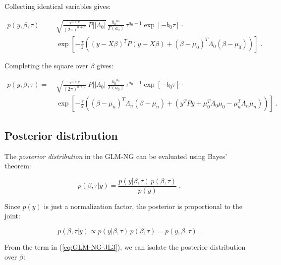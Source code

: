 Collecting identical variables gives:

\vspace{-0.5em}
\begin{equation} \label{eq:GLM-NG-JL2}
\begin{split}
p(y,\beta,\tau) = \; & \sqrt{\frac{\tau^{n+p}}{(2 \pi)^{n+p}} |P| |\Lambda_0|} \, \frac{{b_0}^{a_0}}{\Gamma(a_0)} \, \tau^{a_0-1} \exp[-b_0 \tau] \cdot \\
& \exp\left[ -\frac{\tau}{2} \left( (y-X\beta)^T P (y-X\beta) + (\beta-\mu_0)^T \Lambda_0 (\beta-\mu_0) \right) \right] \; .
\end{split}
\end{equation}

\pagebreak
Completing the square over $\beta$ gives:

\vspace{-0.5em}
\begin{equation} \label{eq:GLM-NG-JL3}
\begin{split}
p(y,\beta,\tau) = \; & \sqrt{\frac{\tau^{n+p}}{(2 \pi)^{n+p}} |P| |\Lambda_0|} \, \frac{{b_0}^{a_0}}{\Gamma(a_0)} \, \tau^{a_0-1} \exp[-b_0 \tau] \cdot \\
& \exp\left[ -\frac{\tau}{2} \left( (\beta-\mu_n)^T \Lambda_n (\beta-\mu_n) + (y^T P y + \mu_0^T \Lambda_0 \mu_0 - \mu_n^T \Lambda_n \mu_n) \right) \right] \; .
\end{split}
\end{equation}


\subsection{Posterior distribution} \label{sec:GLM-NG-post}

The \textit{posterior distribution} in the GLM-NG can be evaluated using Bayes' theorem:

\begin{equation} \label{eq:GLM-NG-BT}
p(\beta,\tau|y) = \frac{p(y|\beta,\tau) \, p(\beta,\tau)}{p(y)} \; .
\end{equation}

Since $p(y)$ is just a normalization factor, the posterior is proportional to the joint:

\begin{equation} \label{eq:GLM-NG-post}
p(\beta,\tau|y) \propto p(y|\beta,\tau) \, p(\beta,\tau) = p(y,\beta,\tau) \; .
\end{equation}

From the term in (\ref{eq:GLM-NG-JL3}), we can isolate the posterior distribution over $\beta$:

